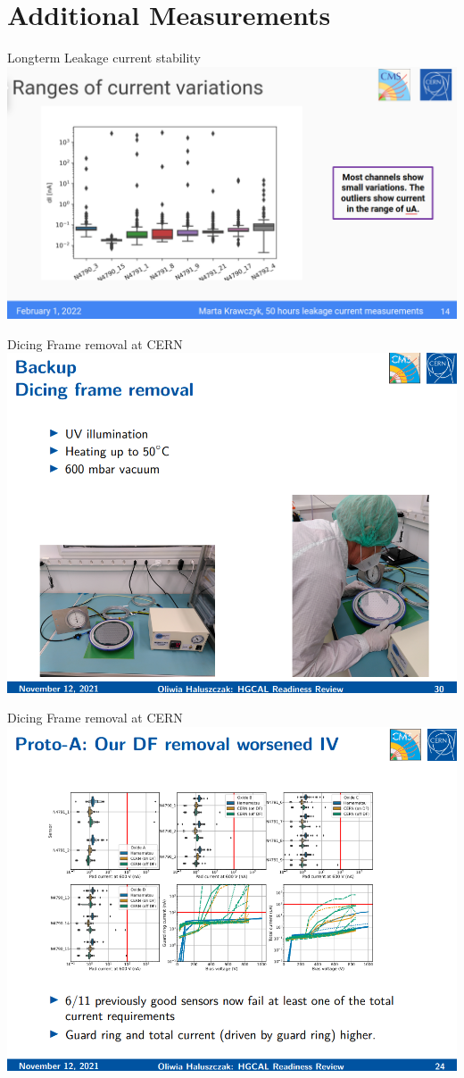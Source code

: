 \documentclass{beamer}
\begin{document}
\section{Additional Measurements}


\begin{frame}{Longterm Leakage current stability}
  \includegraphics[width=.7\textwidth]{plots/Longterm_ranges.png}
  \href{https://indico.cern.ch/event/1085830/contributions/4565314/attachments/2344490/3998306/IVCV_recent_HGCal_prototype_sensors_Readiness_Review.pdf}{}
\end{frame}

\begin{frame}{Dicing Frame removal at CERN}
  \includegraphics[width=.7\textwidth]{plots/DF_removal_Process.png}
  \href{https://indico.cern.ch/event/1121372/contributions/4708329/attachments/2382634/4071804/Longterm_Leakage_Current_Measurements.pdf}{}
\end{frame}

\begin{frame}{Dicing Frame removal at CERN}
  \includegraphics[width=.7\textwidth]{plots/Dicing_Frame_Removal.png}
\end{frame}
\end{document}
